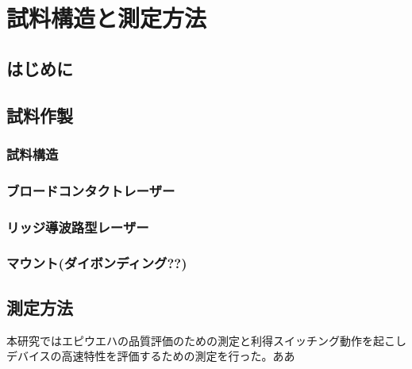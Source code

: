 
\chapter{試料構造と測定方法}

\section{はじめに}

\section{試料作製}
\subsection{試料構造}
\subsection{ブロードコンタクトレーザー}
\subsection{リッジ導波路型レーザー}
\subsection{マウント(ダイボンディング??)}
\section{測定方法}
本研究ではエピウエハの品質評価のための測定と利得スイッチング動作を起こしデバイスの高速特性を評価するための測定を行った。ああ
